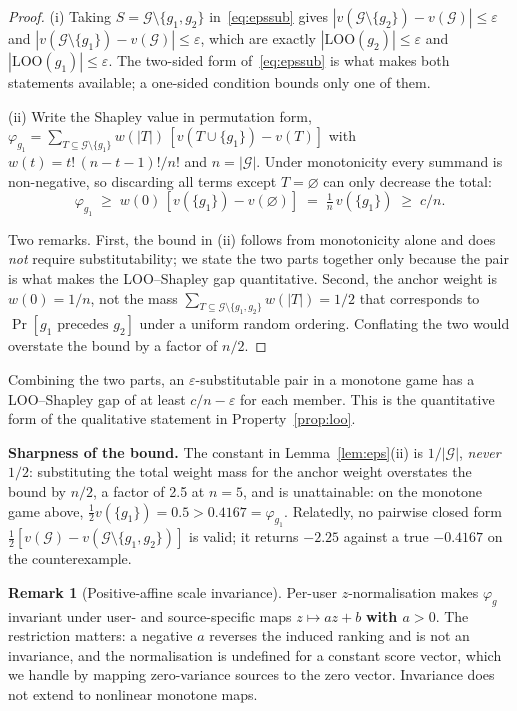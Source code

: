 \documentclass[pdflatex,sn-basic,Numbered]{sn-jnl}
\theoremstyle{plain}
\theoremstyle{definition}
\newtheorem{remark}{Remark}
\newcommand{\G}{\mathcal{G}}
\newcommand{\LOO}{\mathrm{LOO}}
\begin{document}
\begin{proof}
(i) Taking $S = \G\setminus\{g_1,g_2\}$ in~\eqref{eq:epssub} gives
$|v(\G\setminus\{g_2\}) - v(\G)| \le \varepsilon$ and
$|v(\G\setminus\{g_1\}) - v(\G)| \le \varepsilon$, which are exactly
$|\LOO(g_2)| \le \varepsilon$ and $|\LOO(g_1)| \le \varepsilon$. The two-sided
form of~\eqref{eq:epssub} is what makes both statements available; a one-sided
condition bounds only one of them.

(ii) Write the Shapley value in permutation form,
$\varphi_{g_1} = \sum_{T \subseteq \G\setminus\{g_1\}} w(|T|)\,
[v(T\cup\{g_1\}) - v(T)]$ with $w(t) = t!\,(n-t-1)!/n!$ and $n = |\G|$. Under
monotonicity every summand is non-negative, so discarding all terms except
$T = \varnothing$ can only decrease the total:
\[
\varphi_{g_1} \;\ge\; w(0)\,[v(\{g_1\}) - v(\varnothing)]
\;=\; \tfrac{1}{n}\,v(\{g_1\}) \;\ge\; c/n .
\]

Two remarks. First, the bound in (ii) follows from monotonicity alone and does
\emph{not} require substitutability; we state the two parts together only
because the pair is what makes the LOO--Shapley gap quantitative. Second, the
anchor weight is $w(0) = 1/n$, not the mass
$\sum_{T \subseteq \G\setminus\{g_1,g_2\}} w(|T|) = 1/2$ that corresponds to
$\Pr[g_1 \text{ precedes } g_2]$ under a uniform random ordering. Conflating
the two would overstate the bound by a factor of $n/2$.
\end{proof}

\noindent
Combining the two parts, an $\varepsilon$-substitutable pair in a monotone game
has a LOO--Shapley gap of at least $c/n - \varepsilon$ for each member. This is
the quantitative form of the qualitative statement in
Property~\ref{prop:loo}.

\noindent
\textbf{Sharpness of the bound.} The constant in
Lemma~\ref{lem:eps}(ii) is $1/|\G|$, \emph{never} $1/2$: substituting the total
weight mass for the anchor weight overstates the bound by $n/2$, a factor of
2.5 at $n=5$, and is unattainable: on the monotone game above, $\tfrac12 v(\{g_1\}) = 0.5 > 0.4167 = \varphi_{g_1}$. Relatedly, no pairwise
closed form $\tfrac12[v(\G) - v(\G\setminus\{g_1,g_2\})]$ is valid; it returns
$-2.25$ against a true $-0.4167$ on the counterexample.

\begin{remark}[Positive-affine scale invariance]
Per-user $z$-normalisation makes $\varphi_g$ invariant under user- and
source-specific maps $z \mapsto az + b$ \textbf{with $a > 0$}. The restriction
matters: a negative $a$ reverses the induced ranking and is not an invariance,
and the normalisation is undefined for a constant score vector, which we handle
by mapping zero-variance sources to the zero vector. Invariance does not extend
to nonlinear monotone maps.
\end{remark}
\end{document}
